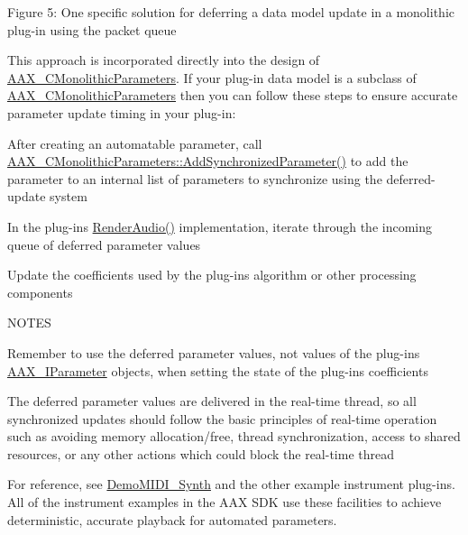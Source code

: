  Figure 5\+: One specific solution for deferring a data model update in a monolithic plug-\/in using the packet queue

This approach is incorporated directly into the design of \mbox{\hyperlink{a01969}{A\+A\+X\+\_\+\+C\+Monolithic\+Parameters}}. If your plug-\/in data model is a subclass of \mbox{\hyperlink{a01969}{A\+A\+X\+\_\+\+C\+Monolithic\+Parameters}} then you can follow these steps to ensure accurate parameter update timing in your plug-\/in\+:


\begin{DoxyEnumerate}
\item After creating an automatable parameter, call \mbox{\hyperlink{a01969_a1b23573e8aa3f8e64c61813b721559c2}{A\+A\+X\+\_\+\+C\+Monolithic\+Parameters\+::\+Add\+Synchronized\+Parameter()}} to add the parameter to an internal list of parameters to synchronize using the deferred-\/update system  
\item In the plug-\/in\textquotesingle{}s \mbox{\hyperlink{a01969_a04f2f73d70ea28c17747c68fc3a20fc8}{Render\+Audio()}} implementation, iterate through the incoming queue of deferred parameter values  
\item Update the coefficients used by the plug-\/in\textquotesingle{}s algorithm or other processing components  
\end{DoxyEnumerate}

N\+O\+T\+ES 
\begin{DoxyItemize}
\item Remember to use the deferred parameter values, not values of the plug-\/in\textquotesingle{}s \mbox{\hyperlink{a01857}{A\+A\+X\+\_\+\+I\+Parameter}} objects, when setting the state of the plug-\/in\textquotesingle{}s coefficients  
\item The deferred parameter values are delivered in the real-\/time thread, so all synchronized updates should follow the basic principles of real-\/time operation such as avoiding memory allocation/free, thread synchronization, access to shared resources, or any other actions which could block the real-\/time thread  
\end{DoxyItemize}

For reference, see \mbox{\hyperlink{a00848_DemoMIDI_Synth}{Demo\+M\+I\+D\+I\+\_\+\+Synth}} and the other example instrument plug-\/ins. All of the instrument examples in the A\+AX S\+DK use these facilities to achieve deterministic, accurate playback for automated parameters.

